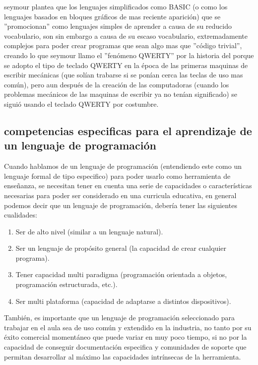 seymour \cite{seymour_papert_desafio_1987} plantea que los lenguajes simplificados como BASIC (o como los lenguajes basados en bloques gráficos de mas reciente aparición) que se  ''promocionan'' como lenguajes simples de aprender a causa de su reducido vocabulario, son sin embargo a causa de su escaso vocabulario, extremadamente complejos para poder crear programas que sean algo mas que ''código trivial'', creando lo que seymour \cite{seymour_papert_desafio_1987} llamo el ''fenómeno QWERTY'' por la historia del porque se adopto el tipo de teclado QWERTY en la época de las primeras maquinas de escribir mecánicas (que solían trabarse si se ponían cerca las teclas de uso mas común), pero aun después de la creación de las computadoras (cuando los problemas mecánicos de las maquinas de escribir ya no tenían significado) se siguió usando el teclado QWERTY por costumbre.

\subsection{competencias especificas para el aprendizaje de un lenguaje de programación}

Cuando hablamos de un lenguaje de programación (entendiendo este como un lenguaje formal de tipo especifico) para poder usarlo como herramienta de enseñanza, se necesitan tener en cuenta una serie de capacidades o características necesarias para poder ser considerado en una curricula educativa, en general podemos decir que un lenguaje de programación, debería tener las siguientes cualidades:

\begin{enumerate}
   \item Ser de alto nivel (similar a un lenguaje natural).
   \item Ser un lenguaje de propósito general (la capacidad de crear cualquier programa).
   \item Tener capacidad multi paradigma (programación orientada a objetos, programación estructurada, etc.).
   \item Ser multi plataforma (capacidad de adaptarse a distintos dispositivos).
 \end{enumerate} 
 
También, es importante que un lenguaje de programación seleccionado para trabajar en el aula sea de uso común y extendido en la industria, no tanto por su éxito comercial momentáneo que puede variar en muy poco tiempo, si no por la capacidad de conseguir documentación especifica y comunidades de soporte que permitan desarrollar al máximo las capacidades intrínsecas de la herramienta.

